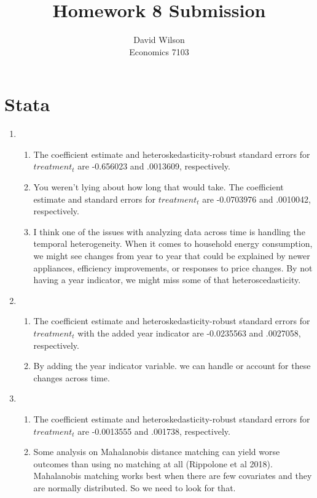 \documentclass{article}
\title{Homework 8 Submission}
\author{David Wilson \\ Economics 7103}
\begin{document}
  
\maketitle

\section{Stata}

\begin{enumerate}
\item  

\begin{enumerate}
\item The coefficient estimate and heteroskedasticity-robust standard errors for $treatment_t$ are -0.656023 and .0013609, respectively. 

\item You weren't lying about how long that would take. The coefficient estimate and standard errors for $treatment_t$ are -0.0703976 and .0010042, respectively.

\item I think one of the issues with analyzing data across time is handling the temporal heterogeneity. When it comes to household energy consumption, we might see changes from year to year that could be explained by newer appliances, efficiency improvements, or responses to price changes. By not having a year indicator, we might miss some of that heteroscedasticity.
\end{enumerate}

\item  
\begin{enumerate}
\item The coefficient estimate and heteroskedasticity-robust standard errors for $treatment_t$ with the added year indicator are -0.0235563 and .0027058, respectively.
\item By adding the year indicator variable. we can handle or account for these changes across time.
\end{enumerate}

\item 
\begin{enumerate}
\item The coefficient estimate and heteroskedasticity-robust standard errors for $treatment_t$ are -0.0013555 and .001738, respectively. 
\item Some analysis on Mahalanobis distance matching can yield worse outcomes than using no matching at all (Rippolone et al 2018). Mahalanobis matching works best when there are few covariates and they are normally distributed. So we need to look for that.
\end{enumerate}

\end{enumerate} 
   
 
\end{document}
